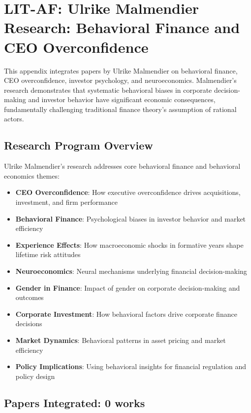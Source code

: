 
\section{LIT-AF: Ulrike Malmendier Research: Behavioral Finance and CEO Overconfidence}
\label{app:litaf}

This appendix integrates papers by Ulrike Malmendier on behavioral finance, CEO overconfidence, investor psychology, and neuroeconomics. Malmendier's research demonstrates that systematic behavioral biases in corporate decision-making and investor behavior have significant economic consequences, fundamentally challenging traditional finance theory's assumption of rational actors.

\subsection{Research Program Overview}

Ulrike Malmendier's research addresses core behavioral finance and behavioral economics themes:

\begin{itemize}
  \item \textbf{CEO Overconfidence}: How executive overconfidence drives acquisitions, investment, and firm performance
  \item \textbf{Behavioral Finance}: Psychological biases in investor behavior and market efficiency
  \item \textbf{Experience Effects}: How macroeconomic shocks in formative years shape lifetime risk attitudes
  \item \textbf{Neuroeconomics}: Neural mechanisms underlying financial decision-making
  \item \textbf{Gender in Finance}: Impact of gender on corporate decision-making and outcomes
  \item \textbf{Corporate Investment}: How behavioral factors drive corporate finance decisions
  \item \textbf{Market Dynamics}: Behavioral patterns in asset pricing and market efficiency
  \item \textbf{Policy Implications}: Using behavioral insights for financial regulation and policy design
\end{itemize}

\subsection{Papers Integrated: 0 works}


